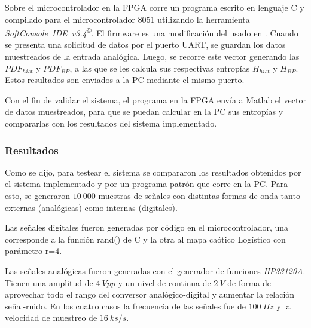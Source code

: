 Sobre el microcontrolador en la FPGA corre un programa escrito en lenguaje C y compilado para el microcontrolador 8051 utilizando la herramienta \textit{SoftConsole~IDE~v3.4\textsuperscript\copyright}.
El firmware es una modificación del usado en \cite{Core8051sS}. Cuando se presenta una solicitud de datos por el puerto UART, se guardan los datos muestreados de la entrada analógica.
Luego, se recorre este vector generando las $PDF_{hist}$ y $PDF_{BP}$, a las que se les calcula sus respectivas entropías $H_{hist}$ y $H_{BP}$.
Estos resultados son enviados a la PC mediante el mismo puerto.

Con el fin de validar el sistema, el programa en la FPGA envía a  Matlab el vector de datos muestreados, para que se puedan calcular en la PC sus entropías y compararlas con los resultados del sistema implementado.

\subsubsection{Resultados}
\label{sec:resultados}

Como se dijo, para testear el sistema se compararon los resultados obtenidos por el sistema implementado y por un programa patrón que corre en la PC.
Para esto, se generaron $10~000$ muestras de señales con distintas formas de onda tanto externas (analógicas) como internas (digitales).

Las señales digitales fueron generadas por código en el microcontrolador, una corresponde a la función rand() de C y la otra al mapa caótico Logístico con parámetro r=4.

Las señales analógicas fueron generadas con el generador de funciones \textit{HP33120A}.
Tienen una amplitud de $4~Vpp$ y un nivel de continua de $2~V$ de forma de aprovechar todo el rango del conversor analógico-digital y aumentar la relación señal-ruido.
En los cuatro casos la frecuencia de las señales fue de $100~Hz$ y la velocidad de muestreo de $16~ks/s$.

